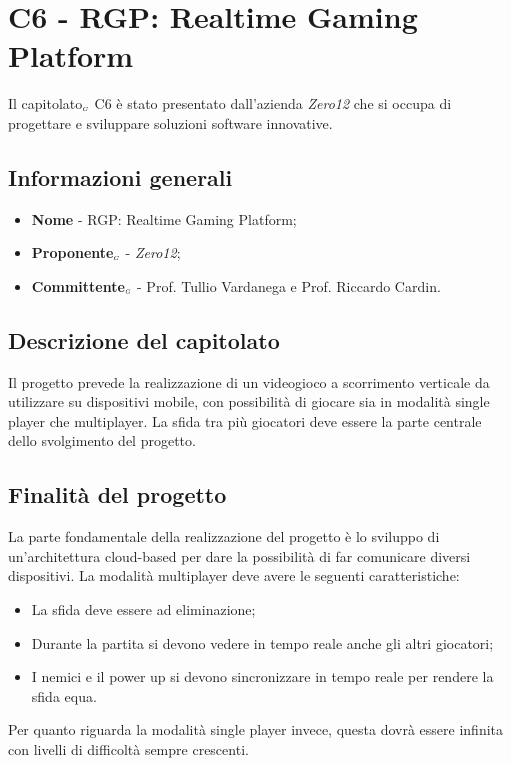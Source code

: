 \chapter{C6 - RGP: Realtime Gaming Platform} \label{CapitolatoC6}
Il capitolato$_{\scaleto{G}{3pt}}$ C6 è stato presentato dall'azienda \textit{Zero12} che si occupa di progettare e sviluppare soluzioni software innovative. 
\section{Informazioni generali} \label{C6InformazioniGenerali}
\begin{itemize}
	\item \textbf{Nome} - RGP: Realtime Gaming Platform;
	\item \textbf{Proponente}$_{\scaleto{G}{3pt}}$ - \textit{Zero12};
	\item \textbf{Committente}$_{\scaleto{G}{3pt}}$ - Prof. Tullio Vardanega e Prof. Riccardo Cardin.
\end{itemize}
\section{Descrizione del capitolato} \label{C6DescrizioneDelCapitolato}
Il progetto prevede la realizzazione di un videogioco a scorrimento verticale da utilizzare su dispositivi mobile, con possibilità di giocare sia in modalità single player che multiplayer. La sfida tra più giocatori deve essere la parte centrale dello svolgimento del progetto.
\section{Finalità del progetto} \label{C6FinalitàDelProgetto}
La parte fondamentale della realizzazione del progetto è lo sviluppo di un'architettura cloud-based  per dare la possibilità di far comunicare diversi dispositivi. La modalità multiplayer deve avere le seguenti caratteristiche:
\begin{itemize}
	\item La sfida deve essere ad eliminazione;
	\item Durante la partita si devono vedere in tempo reale anche gli altri giocatori;
	\item I nemici e il power up si devono sincronizzare in tempo reale per rendere la sfida equa.
\end{itemize}
Per quanto riguarda la modalità single player invece, questa dovrà essere infinita con livelli di difficoltà sempre crescenti.
